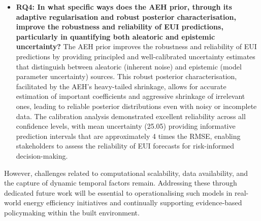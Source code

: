 \begin{itemize}
\item \textbf{RQ4: In what specific ways does the AEH prior, through its adaptive regularisation and robust posterior characterisation, improve the robustness and reliability of EUI predictions, particularly in quantifying both aleatoric and epistemic uncertainty?}
The AEH prior improves the robustness and reliability of EUI predictions by providing principled and well-calibrated uncertainty estimates that distinguish between aleatoric (inherent noise) and epistemic (model parameter uncertainty) sources. This robust posterior characterisation, facilitated by the AEH's heavy-tailed shrinkage, allows for accurate estimation of important coefficients and aggressive shrinkage of irrelevant ones, leading to reliable posterior distributions even with noisy or incomplete data. The calibration analysis demonstrated excellent reliability across all confidence levels, with mean uncertainty (25.05) providing informative prediction intervals that are approximately 4 times the RMSE, enabling stakeholders to assess the reliability of EUI forecasts for risk-informed decision-making.
\end{itemize}

However, challenges related to computational scalability, data availability, and the capture of dynamic temporal factors remain. Addressing these through dedicated future work will be essential to operationalising such models in real-world energy efficiency initiatives and continually supporting evidence-based policymaking within the built environment. 